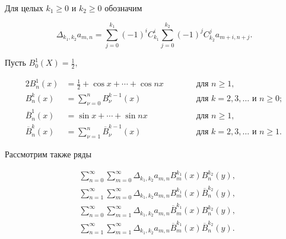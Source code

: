Для целых $k_1\ge 0$ и $k_2\ge 0$ обозначим 


$$ 


\Delta_{k_1,k_2}a_{m,n}=\sum^{k_1}_{j=0}(-1)^i C^i_{k_1} 


\sum^{k_2}_{j=0}(-1)^j C^j_{k_2}a_{m+i,n+j}. 


$$ 


Пусть $B^1_0(X)=\frac{1}{2},$ 


\begin{alignat*}{2} 


B^1_n(x)&=\frac{1}{2}+\cos x+\dotsb+\cos nx &\qquad &\text{ для } n\ge 1,\\ 


B^k_n(x)&=\sum^n_{\nu=0}B_\nu^{k-1}(x) &\qquad 


&\text{ для }k=2,3,\dotsc \text{ и }n\ge 0; \\ 


\overline B^1_n(x)&=\sin x+\dotsb+\sin nx &\qquad&\text{ для }n\ge 1,\\ 


\overline B^k_n(x)&=\sum^n_{\nu=1}\overline B_\nu^{k-1}(x)&\qquad 


&\text{ для } k=2,3,\dotsc \text{ и }n\ge 1. 


\end{alignat*} 


 


Рассмотрим также ряды 


\begin{align*} 


&\sum^\infty_{n=0}\sum^\infty_{m=0}\Delta_{k_1,k_2}a_{m,n}B_m^{k_1}(x) 


B_n^{k_2}(y), \tag{I$'$}\\ 


% 


&\sum^\infty_{n=1}\sum^\infty_{m=0}\Delta_{k_1,k_2}a_{m,n} 


B_m^{k_1}(x)\overline B_n^{k_2}(y), \tag{II$'$}\\ 


% 


&\sum^\infty_{n=0}\sum^\infty_{m=1}\Delta_{k_1,k_2}a_{m,n} 


\overline B_m^{k_1}(x) 


B_n^{k_2}(y), \tag{III$'$}\\ 


% 


&\sum^\infty_{n=1}\sum^\infty_{m=1}\Delta_{k_1,k_2}a_{m,n} 


\overline B_m^{k_1}(x) 


\overline B_n^{k_2}(y). \tag{IV$'$} 


\end{align*} 


